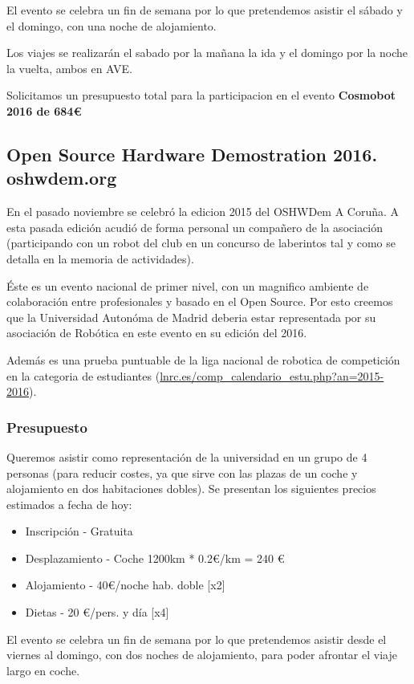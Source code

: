 \documentclass[12pt,twoside]{report}
\begin{document}
El evento se celebra un fin de semana por lo que pretendemos asistir el sábado y el domingo, con una noche de alojamiento.

Los viajes se realizarán el sabado por la mañana la ida y el domingo por la noche la vuelta, ambos en AVE.

Solicitamos un presupuesto total para la participacion en el evento {\bf Cosmobot 2016 de 684\euro{}}

\subsection{Open Source Hardware Demostration 2016. oshwdem.org}
En el pasado noviembre se celebró la edicion 2015 del OSHWDem A Coruña. A esta pasada edición acudió de forma personal un compañero de la asociación (participando con un robot del club en un concurso de laberintos tal y como se detalla en la memoria de actividades).

Éste es un evento nacional de primer nivel, con un magnifico ambiente de colaboración entre profesionales y basado en el Open Source. Por esto creemos que la Universidad Autonóma de Madrid deberia estar representada por su asociación de Robótica en este evento en su edición del 2016.

Además es una prueba puntuable de la liga nacional de robotica de competición en la categoria de estudiantes (\url{lnrc.es/comp_calendario_estu.php?an=2015-2016}).

\subsubsection{Presupuesto}
Queremos asistir como representación de la universidad en un grupo de 4 personas (para reducir costes, ya que sirve con las plazas de un coche y alojamiento en dos habitaciones dobles). Se presentan los siguientes precios estimados a fecha de hoy:
\begin{itemize}
\item Inscripción - Gratuita
\item Desplazamiento - Coche 1200km * 0.2\euro{}/km = 240 \euro{}
\item Alojamiento - 40\euro{}/noche hab. doble [x2]
\item Dietas - 20 \euro{}/pers. y día [x4]
\end{itemize}
El evento se celebra un fin de semana por lo que pretendemos asistir desde el viernes al domingo, con dos noches de alojamiento, para poder afrontar el viaje largo en coche.
\end{document}
